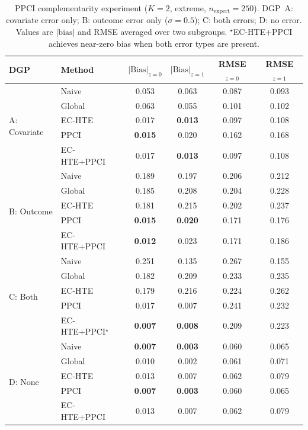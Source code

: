 \begin{table}[t]
\centering
\caption{PPCI complementarity experiment ($K{=}2$, extreme, $n_{\text{expert}}{=}250$). DGP~A: covariate error only; B: outcome error only ($\sigma{=}0.5$); C: both errors; D: no error. Values are $|\text{bias}|$ and RMSE averaged over two subgroups. $^\star$EC-HTE+PPCI achieves near-zero bias when both error types are present.}
\label{tab:ppci}
\small
\begin{tabular}{ll cccc}
\toprule
DGP & Method & $|\text{Bias}|_{z=0}$ & $|\text{Bias}|_{z=1}$ & RMSE$_{z=0}$ & RMSE$_{z=1}$ \\
\midrule
\multirow{5}{*}{A: Covariate}
 & Naive & 0.053 & 0.063 & 0.087 & 0.093 \\
 & Global & 0.063 & 0.055 & 0.101 & 0.102 \\
 & EC-HTE & 0.017 & \textbf{0.013} & 0.097 & 0.108 \\
 & PPCI & \textbf{0.015} & 0.020 & 0.162 & 0.168 \\
 & EC-HTE+PPCI & 0.017 & \textbf{0.013} & 0.097 & 0.108 \\
\midrule
\multirow{5}{*}{B: Outcome}
 & Naive & 0.189 & 0.197 & 0.206 & 0.212 \\
 & Global & 0.185 & 0.208 & 0.204 & 0.228 \\
 & EC-HTE & 0.181 & 0.215 & 0.202 & 0.237 \\
 & PPCI & \textbf{0.015} & \textbf{0.020} & 0.171 & 0.176 \\
 & EC-HTE+PPCI & \textbf{0.012} & 0.023 & 0.171 & 0.186 \\
\midrule
\multirow{5}{*}{C: Both}
 & Naive & 0.251 & 0.135 & 0.267 & 0.155 \\
 & Global & 0.182 & 0.209 & 0.233 & 0.235 \\
 & EC-HTE & 0.179 & 0.216 & 0.224 & 0.262 \\
 & PPCI & 0.017 & 0.007 & 0.241 & 0.232 \\
 & EC-HTE+PPCI$^\star$ & \textbf{0.007} & \textbf{0.008} & 0.209 & 0.223 \\
\midrule
\multirow{5}{*}{D: None}
 & Naive & \textbf{0.007} & \textbf{0.003} & 0.060 & 0.065 \\
 & Global & 0.010 & 0.002 & 0.061 & 0.071 \\
 & EC-HTE & 0.013 & 0.007 & 0.062 & 0.079 \\
 & PPCI & \textbf{0.007} & \textbf{0.003} & 0.060 & 0.065 \\
 & EC-HTE+PPCI & 0.013 & 0.007 & 0.062 & 0.079 \\
\bottomrule
\end{tabular}
\end{table}
